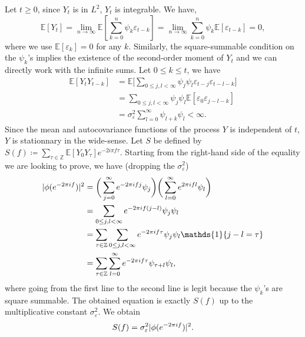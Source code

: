 \documentclass[11pt]{article}
\DeclarePairedDelimiter\abs{|}{|}
\begin{document}
\begin{solution}  %
    Let $t\geq 0$, since $Y_t$ is in $L^2$, $Y_t$ is integrable. We have,
    \begin{equation}
        \mathbb{E}[Y_t] = \lim_{n\to\infty} \mathbb{E}[\sum_{k=0}^{n}\psi_k \varepsilon_{t-k}] = \lim_{n\to\infty} \sum_{k=0}^{n}\psi_k \mathbb{E}[\varepsilon_{t-k}] = 0,
    \end{equation}
    where we use $\mathbb{E}[\varepsilon_k] = 0$ for any $k$.
    Similarly, the square-summable condition on the $\psi_k$'s implies the existence of the second-order moment of $Y_t$ and we can directly work with the infinite sums. Let $0\leq k\leq t$, we have
    \begin{equation}
        \begin{split}
            \mathbb{E}[Y_t Y_{t-k}] &= \mathbb{E}\bigg[\sum_{0\leq j,l<\infty} \psi_j \psi_l \varepsilon_{t-j}\varepsilon_{t-l-k}\bigg]\\
            &= \sum_{0\leq j,l<\infty} \psi_j \psi_l \mathbb{E}[\varepsilon_0 \varepsilon_{j-l-k}]\\
            &=\sigma^2_{\varepsilon} \sum_{l=0}^{\infty} \psi_{l+k}\psi_l<\infty.
        \end{split}
    \end{equation}
    Since the mean and autocovariance functions of the process $Y$ is independent of $t$, $Y$ is stationnary in the wide-sense.
    Let $S$ be defined by $S(f) \coloneqq \sum_{\tau \in \mathbb{Z}} \mathbb{E}[Y_0Y_{\tau}]e^{-2i\pi f \tau}$. Starting from the right-hand side of the equality we are looking to prove, we have (dropping the $\sigma_{\varepsilon}^2$)
    \begin{equation}
        \begin{split}
            \abs{\phi(e^{-2\pi i f})}^2 &= \bigg(\sum_{j=0}^{\infty}e^{-2\pi i f j}\psi_j\bigg)\bigg(\sum_{l=0}^{\infty}e^{2\pi i f l}\psi_l\bigg)\\
            &= \sum_{0\leq j,l<\infty}e^{-2\pi i f (j-l)}\psi_j\psi_l\\
            &= \sum_{\tau\in\mathbb{Z}} \sum_{0\leq j,l<\infty}e^{-2\pi i f \tau}\psi_{j}\psi_{l}\mathds{1}\{j-l=\tau\}\\
            &= \sum_{\tau\in\mathbb{Z}}\sum_{l=0}^{\infty}e^{-2\pi i f \tau}\psi_{\tau + l}\psi_l,
        \end{split}
    \end{equation}
    where going from the first line to the second line is legit because the $\psi_k$'s are square summable. The obtained equation is exactly $S(f)$ up to the multiplicative constant $\sigma_{\varepsilon}^2$. We obtain
    \begin{equation}
        S(f)  = \sigma_{\varepsilon}^2 \abs{\phi(e^{-2\pi i f})}^2.
    \end{equation}

\end{solution}
\end{document}
